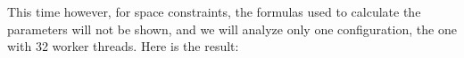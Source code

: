 \documentclass[11pt,a4paper]{article}
\begin{document}
This time however, for space constraints, the formulas used to calculate the parameters
will not be shown, and we will analyze only one configuration, the one with 32 worker threads.
Here is the result:





\end{document}
